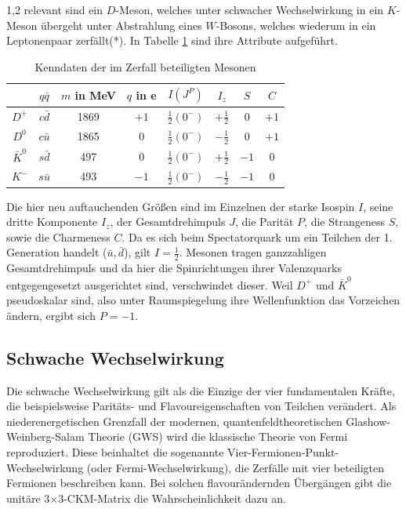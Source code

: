 \documentclass[11pt,a4paper,twoside]{report}
\begin{document}
\begin{spacing}{1,2}
relevant sind ein $D$-Meson, welches unter schwacher Wechselwirkung in ein $K$-Meson übergeht unter Abstrahlung eines $W$-Bosons, welches wiederum in ein 
Leptonenpaar zerfällt(*). In Tabelle \ref{tab_DKMeson} sind ihre Attribute \cite{PDG} aufgeführt.
\begin{table}[H]
\begin{tabular}{c|ccc|cccc} \toprule 
  & $q\bar q$ &  $m$ in MeV & $q$ in e & $I(J^P)$ & $I_z$ & $S$ & $C$\\
 \midrule
  $D^+$ & $c\bar d$ & 1869 & $+1$ & $\frac12(0^-)$ & $+\frac12$ & 0 & $+1$\\
  $D^0$ & $c\bar u$ & 1865 & $0$  & $\frac12(0^-)$ & $-\frac12$ & 0 & $+1$\\
  $\bar K^0$ & $s\bar d$ & 497 & $0$ & $\frac12(0^-)$ & $+\frac12$ & $-1$& 0\\
  $K^-$ & $s\bar u $ & 493 & $-1$ & $\frac12(0^-)$ & $-\frac12$ & $-1$ & 0
\\\bottomrule \bottomrule
 \end{tabular}
\caption{Kenndaten der im Zerfall beteiligten Mesonen}
\label{tab_DKMeson}
\end{table}
\noindent
Die hier neu auftauchenden Größen sind im Einzelnen der starke Isospin $I$, seine dritte Komponente $I_z$, der Gesamtdrehimpuls $J$, die Parität $P$, die
Strangeness $S$, sowie die Charmeness $C$. Da es sich beim Spectatorquark um ein Teilchen der 1. Generation handelt ($\bar u, \bar d$), gilt $I = \frac12$. 
Mesonen tragen ganzzahligen Gesamtdrehimpuls und da hier die Spinrichtungen ihrer Valenzquarks entgegengesetzt 
ausgerichtet sind, verschwindet dieser. Weil $D^+$ und $\bar K^0$ pseudoskalar sind, also unter Raumspiegelung ihre Wellenfunktion das Vorzeichen ändern, 
ergibt sich $P=-1$.

\subsection{Schwache Wechselwirkung}
\label{sec_schwacheWW}
Die schwache Wechselwirkung gilt als die Einzige der vier fundamentalen Kräfte, die beispielsweise Paritäts- und Flavoureigenschaften von Teilchen verändert.
Als niederenergetischen Grenzfall der modernen, quantenfeldtheoretischen Glashow-Weinberg-Salam Theorie (GWS) wird die klassische Theorie von Fermi 
reproduziert. Diese beinhaltet die
sogenannte Vier-Fermionen-Punkt-Wechselwirkung (oder Fermi-Wechselwirkung), die Zerfälle mit vier beteiligten Fermionen beschreiben kann. Bei solchen
flavourändernden Übergängen gibt die unitäre 3$\times$3-CKM-Matrix die Wahrscheinlichkeit dazu an. 


\end{spacing}
\end{document}
